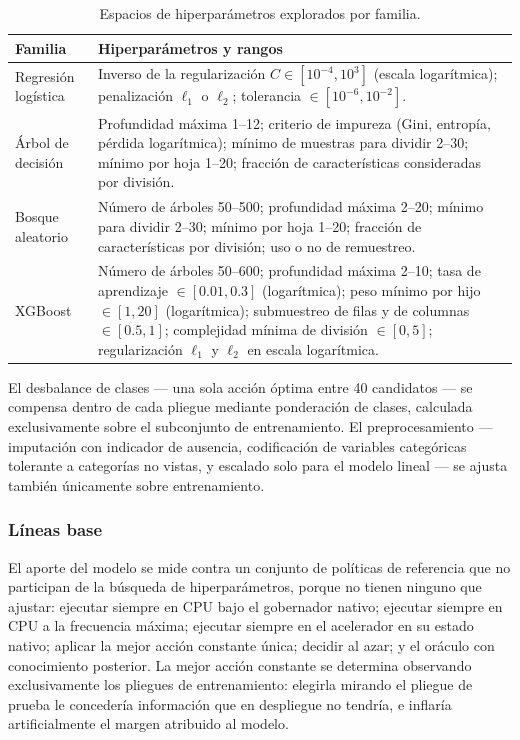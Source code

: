 \documentclass[12pt,oneside,spanish]{book}
\begin{document}
\begin{table}[H]
\centering
\caption[Espacios de hiperparámetros por familia]{Espacios de hiperparámetros explorados por familia.}
\label{tab:hiperparametros}
\begin{tabular}{@{}p{3.1cm}p{11.4cm}@{}}
\toprule
\textbf{Familia} & \textbf{Hiperparámetros y rangos} \\
\midrule
Regresión logística & Inverso de la regularización $C\in[10^{-4},10^{3}]$ (escala logarítmica); penalización $\ell_1$ o $\ell_2$; tolerancia $\in[10^{-6},10^{-2}]$. \\
\addlinespace
Árbol de decisión & Profundidad máxima 1--12; criterio de impureza (Gini, entropía, pérdida logarítmica); mínimo de muestras para dividir 2--30; mínimo por hoja 1--20; fracción de características consideradas por división. \\
\addlinespace
Bosque aleatorio & Número de árboles 50--500; profundidad máxima 2--20; mínimo para dividir 2--30; mínimo por hoja 1--20; fracción de características por división; uso o no de remuestreo. \\
\addlinespace
XGBoost & Número de árboles 50--600; profundidad máxima 2--10; tasa de aprendizaje $\in[0.01,0.3]$ (logarítmica); peso mínimo por hijo $\in[1,20]$ (logarítmica); submuestreo de filas y de columnas $\in[0.5,1]$; complejidad mínima de división $\in[0,5]$; regularización $\ell_1$ y $\ell_2$ en escala logarítmica. \\
\bottomrule
\end{tabular}
\end{table}

El desbalance de clases --- una sola acción óptima entre 40 candidatos --- se compensa dentro de cada pliegue mediante ponderación de clases, calculada exclusivamente sobre el subconjunto de entrenamiento. El preprocesamiento --- imputación con indicador de ausencia, codificación de variables categóricas tolerante a categorías no vistas, y escalado solo para el modelo lineal --- se ajusta también únicamente sobre entrenamiento.

\subsubsection*{Líneas base}

El aporte del modelo se mide contra un conjunto de políticas de referencia que no participan de la búsqueda de hiperparámetros, porque no tienen ninguno que ajustar: ejecutar siempre en CPU bajo el gobernador nativo; ejecutar siempre en CPU a la frecuencia máxima; ejecutar siempre en el acelerador en su estado nativo; aplicar la mejor acción constante única; decidir al azar; y el oráculo con conocimiento posterior. La mejor acción constante se determina observando exclusivamente los pliegues de entrenamiento: elegirla mirando el pliegue de prueba le concedería información que en despliegue no tendría, e inflaría artificialmente el margen atribuido al modelo.
\end{document}
